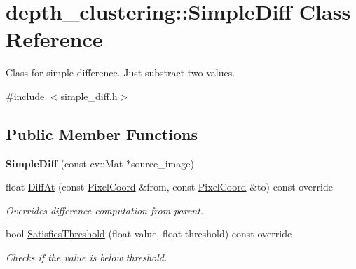 \hypertarget{classdepth__clustering_1_1SimpleDiff}{}\section{depth\+\_\+clustering\+:\+:Simple\+Diff Class Reference}
\label{classdepth__clustering_1_1SimpleDiff}


Class for simple difference. Just substract two values.  




{\ttfamily \#include $<$simple\+\_\+diff.\+h$>$}

\subsection*{Public Member Functions}
\begin{DoxyCompactItemize}
\item 
\mbox{\label{classdepth__clustering_1_1SimpleDiff_aab5f0ec87c9be2afd089420070126a99}} 
{\bfseries Simple\+Diff} (const cv\+::\+Mat $\ast$source\+\_\+image)
\item 
\mbox{\label{classdepth__clustering_1_1SimpleDiff_a3afe28bd6a9cfbaff18e856a04d24824}} 
float \hyperlink{classdepth__clustering_1_1SimpleDiff_a3afe28bd6a9cfbaff18e856a04d24824}{Diff\+At} (const \hyperlink{structdepth__clustering_1_1PixelCoord}{Pixel\+Coord} \&from, const \hyperlink{structdepth__clustering_1_1PixelCoord}{Pixel\+Coord} \&to) const override
\begin{DoxyCompactList}\small\item\em Overrides difference computation from parent. \end{DoxyCompactList}\item 
\mbox{\label{classdepth__clustering_1_1SimpleDiff_a277c862d4ffdf1bfc24bd1bd70cb98a7}} 
bool \hyperlink{classdepth__clustering_1_1SimpleDiff_a277c862d4ffdf1bfc24bd1bd70cb98a7}{Satisfies\+Threshold} (float value, float threshold) const override
\begin{DoxyCompactList}\small\item\em Checks if the value is below threshold. \end{DoxyCompactList}\end{DoxyCompactItemize}
